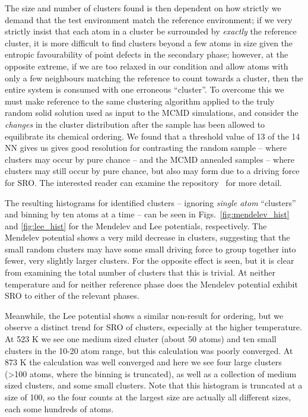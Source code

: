 The size and number of clusters found is then dependent on how strictly we demand that the test environment match the reference environment;
if we very strictly insist that each atom in a cluster be surrounded by \emph{exactly} the reference cluster, it is more difficult to find clusters beyond a few atoms in size given the entropic favourability of point defects in the secondary phase;
however, at the opposite extreme, if we are too relaxed in our condition and allow atoms with only a few neighbours matching the reference to count towards a cluster, then the entire system is consumed with one erroneous ``cluster''.
To overcome this we must make reference to the same clustering algorithm applied to the truly random solid solution used as input to the MCMD simulations, and consider the \emph{changes} in the cluster distribution after the sample has been allowed to equilibrate its chemical ordering.
We found that a threshold value of 13 of the 14 NN gives us gives good resolution for contrasting the random sample -- where clusters may occur by pure chance -- and the MCMD annealed samples -- where clusters may still occur by pure chance, but also may form due to a driving force for SRO.
The interested reader can examine the  repository~\cite{feal} for more detail.

The resulting histograms for identified clusters -- ignoring \emph{single atom} ``clusters'' and binning by ten atoms at a time -- can be seen in Figs.~\ref{fig:mendelev_hist} and \ref{fig:lee_hist} for the Mendelev and Lee potentials, respectively.
The Mendelev potential shows a very mild decrease in \DOTHREE clusters, suggesting that the small random clusters may have some small driving force to group together into fewer, very slightly larger clusters.
For \BTWO the opposite effect is seen, but it is clear from examining the total number of clusters that this is trivial.
At neither temperature and for neither reference phase does the Mendelev potential exhibit SRO to either of the relevant phases.

Meanwhile, the Lee potential shows a similar non-result for \BTWO ordering, but we observe a distinct trend for SRO of \DOTHREE clusters, especially at the higher temperature.
At 523 K we see one medium sized cluster (about 50 atoms) and ten small clusters in the 10-20 atom range,
but this calculation was poorly converged.
At 873 K the calculation was well converged and here we see four large clusters (>100 atoms, where the binning is truncated), as well as a collection of medium sized clusters, and some small clusters.
Note that this histogram is truncated at a size of 100, so the four counts at the largest size are actually all different sizes, each some hundreds of atoms.


